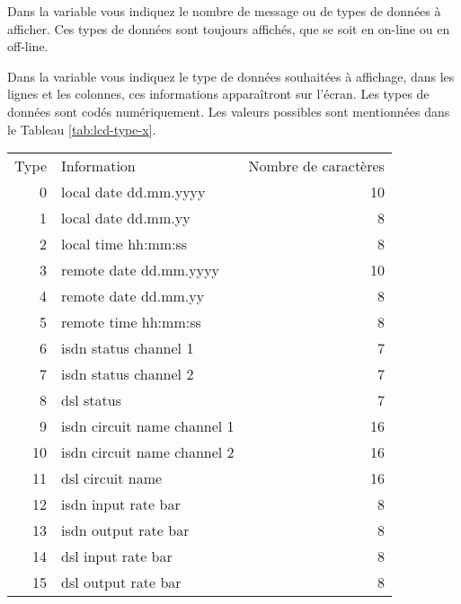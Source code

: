 \begin{description}
      Dans la variable  vous indiquez le nombre de message
      ou de types de données à afficher. Ces types de données sont toujours
      affichés, que se soit en on-line ou en off-line.


        Dans la variable  vous indiquez le type de données
        souhaitées à affichage, dans les lignes et les colonnes, ces informations
        apparaîtront sur l'écran. Les types de données sont codés numériquement.
        Les valeurs possibles sont mentionnées dans le Tableau \ref{tab:lcd-type-x}.


        \begin{table}[htbp]
          \begin{small}
          \begin{center}
            \begin{tabular}{rlr}
               Type &     Information   &        Nombre de caractères \\


                0 &       local date dd.mm.yyyy           & 10 \\
                1 &       local date dd.mm.yy             &  8 \\
                2 &       local time hh:mm:ss             &  8 \\

                3 &       remote date dd.mm.yyyy          & 10 \\
                4 &       remote date dd.mm.yy            &  8 \\
                5 &       remote time hh:mm:ss            &  8 \\

                6 &       isdn status channel 1           &  7 \\
                7 &       isdn status channel 2           &  7 \\
                8 &       dsl status                      &  7 \\

                9 &       isdn circuit name channel 1     & 16 \\
                10 &      isdn circuit name channel 2     & 16 \\
                11 &      dsl circuit name                & 16 \\

                12 &      isdn input rate bar             &  8 \\
                13 &      isdn output rate bar            &  8 \\
                14 &      dsl input rate bar              &  8 \\
                15 &      dsl output rate bar             &  8 \\


\end{tabular}
\end{center}
\end{small}
\end{table}
\end{description}
